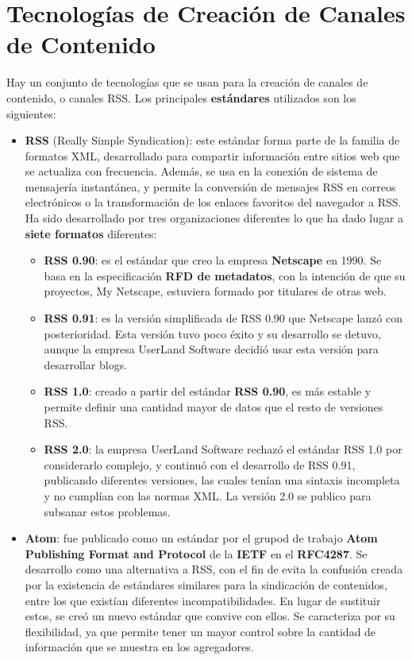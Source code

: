 \section{Tecnologías de Creación de Canales de Contenido}
Hay un conjunto de tecnologías que se usan para la creación de canales de contenido, o canales RSS. Los principales \textbf{estándares} utilizados son los siguientes:

\begin{itemize}
    \item \textbf{RSS} (Really Simple Syndication): este estándar forma parte de la familia de formatos XML, desarrollado para compartir información entre sitios web que se actualiza con frecuencia. Además, se usa en la conexión de sistema de mensajería instantánea, y permite la conversión de mensajes RSS en correos electrónicos o la transformación de los enlaces favoritos del navegador a RSS. Ha sido desarrollado por tres organizaciones diferentes lo que ha dado lugar a \textbf{siete formatos} diferentes:

    \begin{itemize}
        \item \textbf{RSS 0.90}: es el estándar que creo la empresa \textbf{Netscape} en 1990. Se basa en la especificación \textbf{RFD de metadatos}, con la intención de que su proyectos, My Netscape, estuviera formado por titulares de otras web.

        \item \textbf{RSS 0.91}: es la versión simplificada de RSS 0.90 que Netscape lanzó con posterioridad. Esta versión tuvo poco éxito y su desarrollo se detuvo, aunque la empresa UserLand Software decidió usar esta versión para desarrollar blogs.

        \item \textbf{RSS 1.0}: creado a partir del estándar \textbf{RSS 0.90}, es más estable y permite definir una cantidad mayor de datos que el resto de versiones RSS.

        \item \textbf{RSS 2.0}: la empresa UserLand Software rechazó el estándar RSS 1.0 por considerarlo complejo, y continuó con el desarrollo de RSS 0.91, publicando diferentes versiones, las cuales tenían una sintaxis incompleta y no cumplían con las normas XML. La versión 2.0 se publico para subsanar estos problemas.
    \end{itemize}

    \item \textbf{Atom}: fue publicado como un estándar por el grupod de trabajo \textbf{Atom Publishing Format and Protocol} de la \textbf{IETF} en el \textbf{RFC4287}. Se desarrollo como una alternativa a RSS, con el fin de evita la confusión creada por la existencia de estándares similares para la sindicación de contenidos, entre los que existían diferentes incompatibilidades. En lugar de sustituir estos, se creó un nuevo estándar que convive con ellos. Se caracteriza por su flexibilidad, ya que permite tener un mayor control sobre la cantidad de información que se muestra en los agregadores.
\end{itemize}

